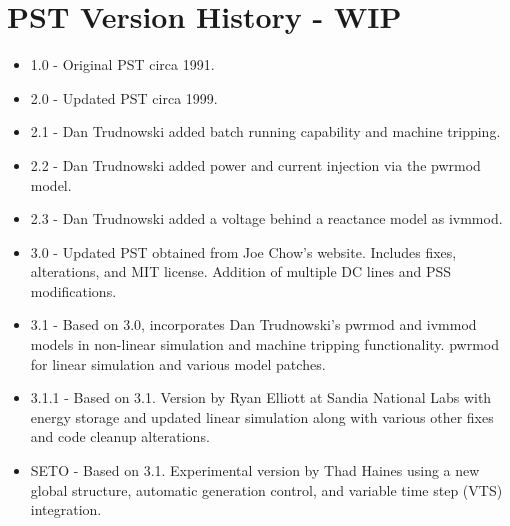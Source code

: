 \chapter{PST Version History - WIP}



\begin{itemize}
 em
\singlespacing
\item 1.0 - Original PST circa 1991.
\item 2.0 - Updated PST circa 1999.
\item 2.1 - Dan Trudnowski added batch running capability and machine tripping.
\item 2.2 - Dan Trudnowski added power and current injection via the pwrmod model.
\item 2.3 - Dan Trudnowski added a voltage behind a reactance model as ivmmod.
\item 3.0 - Updated PST obtained from Joe Chow's website. 
Includes fixes, alterations, and MIT license.
Addition of multiple DC lines and PSS modifications.
\item 3.1 - Based on 3.0, incorporates Dan Trudnowski's pwrmod and ivmmod models in non-linear simulation and machine tripping functionality.
pwrmod for linear simulation and various model patches. 
\item 3.1.1 - Based on 3.1. Version by Ryan Elliott at Sandia National Labs with energy storage and updated linear simulation along with various other fixes and code cleanup alterations. 
\item SETO - Based on 3.1. Experimental version by Thad Haines using a new global structure, automatic generation control, and variable time step (VTS) integration. 



\end{itemize}
